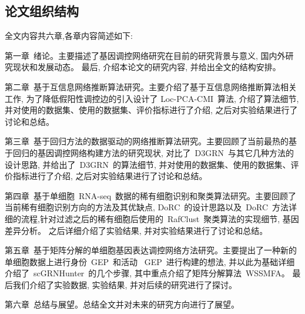\subsection{论文组织结构}

全文内容共六章,各章内容简述如下:

第一章~绪论。主要描述了基因调控网络研究在目前的研究背景与意义, 国内外研究现状和发展动态。
最后, 介绍本论文的研究内容, 并给出全文的结构安排。

第二章~基于互信息网络推断算法研究。主要介绍了基于互信息网络推断算法相关工作, 为了降低假阳性调控边的引入设计了
Loc-PCA-CMI~算法, 介绍了算法细节,并对使用的数据集、使用的数据集、评价指标进行了介绍, 之后对实验结果进行了讨论和总结。

第三章~基于回归方法的数据驱动的网络推断算法研究。主要回顾了当前最热的基于回归的基因调控网络构建方法的研究现状,
对比了~D3GRN~与其它几种方法的设计思路, 并给出了~D3GRN~的算法细节, 并对使用的数据集、使用的数据集、评价指标进行了介绍, 之后对实验结果进行了讨论和总结。

第四章~基于单细胞~RNA-seq~数据的稀有细胞识别和聚类算法研究。主要回顾了当前稀有细胞识别方向的方法及其优缺点, 
DoRC~的设计思路以及~DoRC~方法详细的流程,针对过滤之后的稀有细胞后使用的~RafClust~聚类算法的实现细节, 基因差异分析。
之后详细介绍了实验结果, 并对实验结果进行了讨论和总结。

第五章~基于矩阵分解的单细胞基因表达调控网络方法研究。主要提出了一种新的单细胞数据上进行身份~GEP~和活动~
GEP~进行构建的想法, 并以此为基础详细介绍了~scGRNHunter~的几个步骤, 其中重点介绍了矩阵分解算法~WSSMFA。
最后我们介绍了实验数据, 实验结果, 并对后续的研究进行了探讨。

第六章~总结与展望。总结全文并对未来的研究方向进行了展望。







